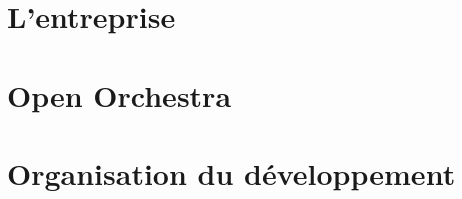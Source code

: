 \documentclass[a4paper, 12pt]{report}
\begin{document}
\newcommand{\HRule}{\rule{\linewidth}{0.5mm}}



~
\thispagestyle{empty}

% 


\tableofcontents
\thispagestyle{empty}
\setcounter{page}{0}

\renewcommand{\arraystretch}{1.5}


~
\thispagestyle{empty}
\setcounter{page}{0}
\newpage

\part{L'entreprise}

\part{Open Orchestra}

\part{Organisation du développement}

\newpage


\nocite{*}



\end{document}
